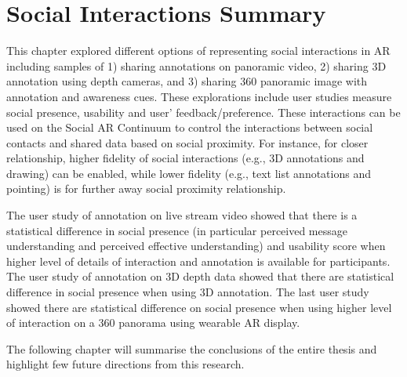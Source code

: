 \section{Social Interactions Summary}

This chapter explored different options of representing social interactions in AR including samples of 1) sharing annotations on panoramic video, 2) sharing 3D annotation using depth cameras, and 3) sharing 360 panoramic image with annotation and awareness cues. These explorations include user studies measure social presence, usability and user' feedback/preference. These interactions can be used on the Social AR Continuum to control the interactions between social contacts and shared data based on social proximity. For instance, for closer relationship, higher fidelity of social interactions (e.g., 3D annotations and drawing) can be enabled, while lower fidelity (e.g., text list annotations and pointing) is for further away social proximity relationship.

The user study of annotation on live stream video showed that there is a statistical difference in social presence (in particular perceived message understanding and perceived effective understanding) and usability score when higher level of details of interaction and annotation is available for participants. The user study of annotation on 3D depth data showed that there are statistical difference in social presence when using 3D annotation. The last user study showed there are statistical difference on social presence when using higher level of interaction on a 360 panorama using wearable AR display. 

The following chapter will summarise the conclusions of the entire thesis and highlight few future directions from this research.
